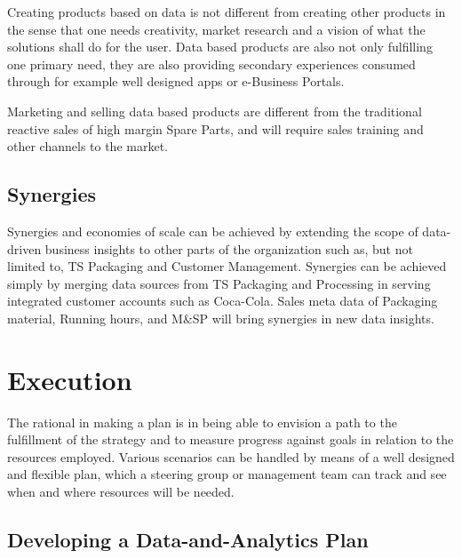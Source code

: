 \documentclass[10pt]{article} %
\begin{document}
Creating products based on data is not different from creating other products in the sense that one needs creativity, market research and a vision of what the solutions shall do for the user. Data based products are also not only fulfilling one primary need, they are also providing secondary experiences consumed through for example well designed apps or e-Business Portals.

Marketing and selling data based products are different from the traditional reactive sales of high margin Spare Parts, and will require sales training and other channels to the market.

\subsection{Synergies}

Synergies and economies of scale can be achieved by extending the scope of data-driven business insights to other parts of the organization such as, but not limited to, TS Packaging and Customer Management. Synergies can be achieved simply by merging data sources from TS Packaging and Processing in serving integrated customer accounts such as Coca-Cola. Sales meta data of Packaging material, Running hours, and M\&SP will bring synergies in new data insights.


\section{Execution}

The rational in making a plan is in being able to envision a path to the fulfillment of the strategy and to measure progress against goals in relation to the resources employed. Various scenarios can be handled by means of a well designed and flexible plan, which a steering group or management team can track and see when and where resources will be needed.


\subsection{Developing a Data-and-Analytics Plan}
\end{document}
